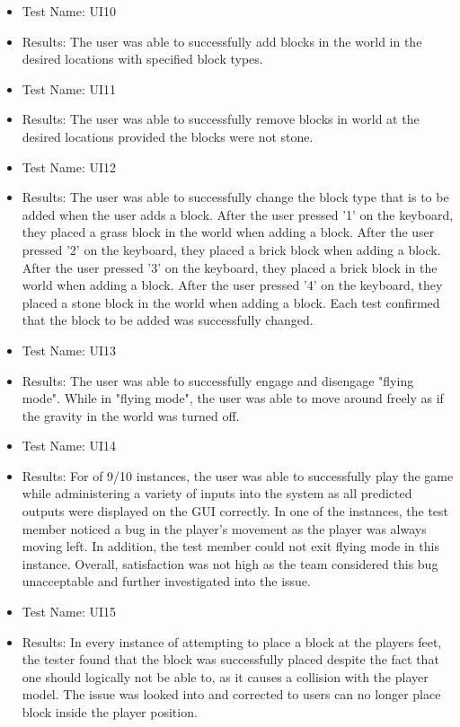 \documentclass[12pt, titlepage]{article}
\begin{document}
\begin{itemize}
    \item[] Test Name: UI10
    \item[] Results: The user was able to successfully add blocks in the world in the desired locations with specified block types.\\
    \item[] Test Name: UI11
    \item[] Results: The user was able to successfully remove blocks in world at the desired locations provided the blocks were not stone.\\
    \item[] Test Name: UI12
    \item[] Results: The user was able to successfully change the block type that is to be added when the user adds a block. After the user pressed '1' on the keyboard, they placed a grass block in the world when adding a block. After the user pressed '2' on the keyboard, they placed a brick block when adding a block. After the user pressed '3' on the keyboard, they placed a brick block in the world when adding a block. After the user pressed '4' on the keyboard, they placed a stone block in the world when adding a block. Each test confirmed that the block to be added was successfully changed.\\
    \item[] Test Name: UI13
    \item[] Results: The user was able to successfully engage and disengage "flying mode". While in "flying mode", the user was able to move around freely as if the gravity in the world was turned off.\\
    \item[] Test Name: UI14
    \item[] Results: For of 9/10 instances, the user was able to successfully play the game while administering a variety of inputs into the system as all predicted outputs were displayed on the GUI correctly. In one of the instances, the test member noticed a bug in the player's movement as the player was always moving left. In addition, the test member could not exit flying mode in this instance. Overall, satisfaction was not high as the team considered this bug unacceptable and further investigated into the issue.\\
    \item[] Test Name: UI15
    \item[] Results: In every instance of attempting to place a block at the players feet, the tester found that the block was successfully placed despite the fact that one should logically not be able to, as it causes a collision with the player model. The issue was looked into and corrected to users can no longer place block inside the player position.\\

\end{itemize}
\end{document}
